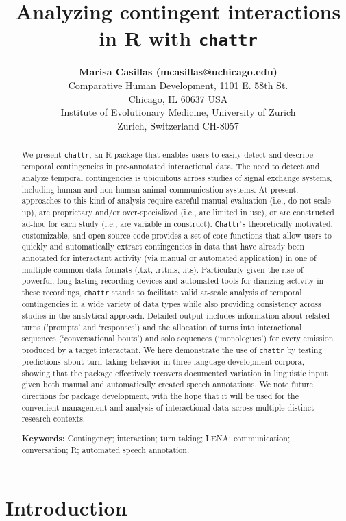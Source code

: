 \documentclass[10pt, letterpaper]{article}
\title{Analyzing contingent interactions in R with \texttt{chattr}}
\author{{\large \bf Marisa Casillas (mcasillas@uchicago.edu)} \\ Comparative Human Development, 1101 E. 58th St. \\ Chicago, IL 60637 USA \AND {\large \bf Camila Scaff (camila.scaff@iem.uzh.ch)} \\ Institute of Evolutionary Medicine, University of Zurich \\ Zurich, Switzerland CH-8057}
\begin{document}
\maketitle

\begin{abstract}
We present \texttt{chattr}, an R package that enables users to easily
detect and describe temporal contingencies in pre-annotated
interactional data. The need to detect and analyze temporal
contingencies is ubiquitous across studies of signal exchange systems,
including human and non-human animal communication systems. At present,
approaches to this kind of analysis require careful manual evaluation
(i.e., do not scale up), are proprietary and/or over-specialized (i.e.,
are limited in use), or are constructed ad-hoc for each study (i.e., are
variable in construct). \texttt{Chattr}`s theoretically motivated,
customizable, and open source code provides a set of core functions that
allow users to quickly and automatically extract contingencies in data
that have already been annotated for interactant activity (via manual or
automated application) in one of multiple common data formats (.txt,
.rttms, .its). Particularly given the rise of powerful, long-lasting
recording devices and automated tools for diarizing activity in these
recordings, \texttt{chattr} stands to facilitate valid at-scale analysis
of temporal contingencies in a wide variety of data types while also
providing consistency across studies in the analytical approach.
Detailed output includes information about related turns ('prompts' and
`responses') and the allocation of turns into interactional sequences
(`conversational bouts') and solo sequences (`monologues') for every
emission produced by a target interactant. We here demonstrate the use
of \texttt{chattr} by testing predictions about turn-taking behavior in
three language development corpora, showing that the package effectively
recovers documented variation in linguistic input given both manual and
automatically created speech annotations. We note future directions for
package development, with the hope that it will be used for the
convenient management and analysis of interactional data across multiple
distinct research contexts.

\textbf{Keywords:}
Contingency; interaction; turn taking; LENA; communication;
conversation; R; automated speech annotation.
\end{abstract}

\hypertarget{introduction}{%
\section{Introduction}\label{introduction}}
\end{document}
